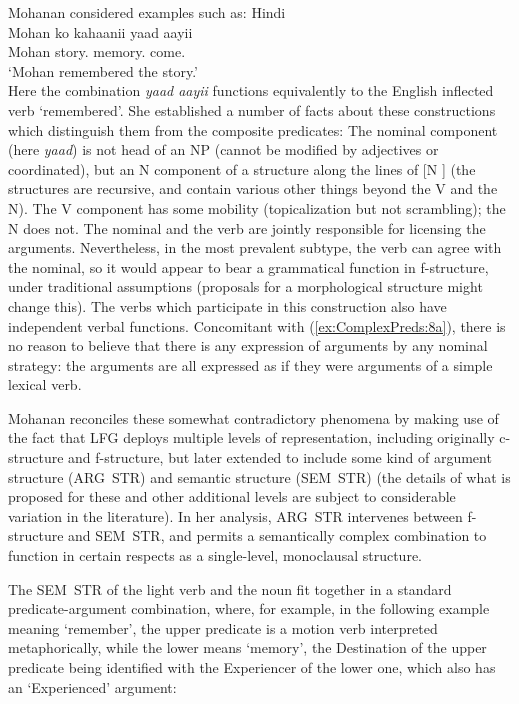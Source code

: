 \documentclass[output=paper,hidelinks]{langscibook}
\begin{document}
Mohanan considered examples such as:
\ea Hindi\\
\gll Mohan ko kahaanii yaad aayii\\
Mohan {\DAT} story.{\NOM} memory.{\NOM} come.\PRF\\
\glt `Mohan remembered the story.'\\
\z
Here the combination \emph{yaad aayii} functions equivalently to the English inflected
verb `remembered'.  She established a number of facts about these constructions which
distinguish them from the composite predicates:
\ea
\ea \label{ex:ComplexPreds:8a}The nominal component (here \emph{yaad}) is not head of an NP (cannot be modified by
adjectives or coordinated), but an N  component
of a structure along the lines of [N ]\textsubscript{} (the structures
are recursive, and contain various other things beyond the V and the N).
\ex The V component has some mobility (topicalization but not scrambling); the N does not.
\ex The nominal and the verb are jointly responsible for licensing the arguments.
\ex Nevertheless, in the most prevalent subtype, the verb can agree with the nominal,
so it would appear
to bear a grammatical function in f-structure, under traditional assumptions (proposals for
a morphological structure might change this).
\ex The verbs which participate in this construction also have independent verbal functions.
\z\z
Concomitant with (\ref{ex:ComplexPreds:8a}), there is no reason to believe that there is any expression of arguments
by any nominal strategy: the arguments are all expressed as if they were arguments of a simple
lexical verb.

Mohanan reconciles these somewhat contradictory phenomena by making use of the fact that LFG
deploys multiple levels of representation, including originally c-structure and f-structure,
but later extended to include some kind of argument structure (ARG~STR) and semantic structure
(SEM~STR) (the details of what is proposed for these and other additional levels are subject to considerable
variation in the literature). In her analysis, ARG~STR intervenes between f-structure and SEM~STR,
and permits a semantically complex combination to function in certain respects as
a single-level, monoclausal structure.

The SEM~STR of the light verb and the noun fit together in a standard predicate-argument combination, where,
for example, in the following example meaning `remember', the upper predicate is a motion verb
interpreted metaphorically, while the lower means `memory', the Destination of the upper predicate
being identified with the Experiencer of the lower one, which also has an `Experienced'
argument:
\end{document}
